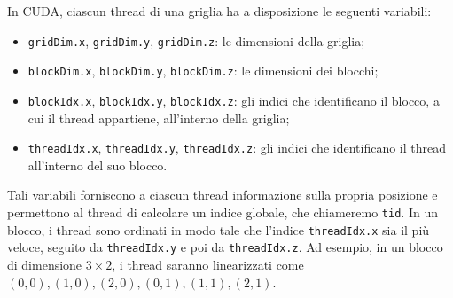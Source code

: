 In CUDA, ciascun thread di una griglia ha a disposizione le seguenti variabili:
\begin{itemize} 
    \item \texttt{gridDim.x}, \texttt{gridDim.y}, \texttt{gridDim.z}: le dimensioni della griglia;
    \item \texttt{blockDim.x}, \texttt{blockDim.y}, \texttt{blockDim.z}: le dimensioni dei blocchi;
    \item \texttt{blockIdx.x}, \texttt{blockIdx.y}, \texttt{blockIdx.z}: gli indici che identificano il blocco, a cui il thread appartiene, all'interno della griglia;
    \item \texttt{threadIdx.x}, \texttt{threadIdx.y}, \texttt{threadIdx.z}: gli indici che identificano il thread all'interno del suo blocco.
\end{itemize}
Tali variabili forniscono a ciascun thread informazione sulla propria posizione e permettono al thread di calcolare un indice globale, che chiameremo \texttt{tid}.
In un blocco, i thread sono ordinati in modo tale che l'indice \texttt{threadIdx.x} sia il più veloce, seguito da \texttt{threadIdx.y} e poi da \texttt{threadIdx.z}. Ad esempio, in un blocco di dimensione \(3\times 2\), i thread saranno linearizzati come \((0,0), (1,0), (2,0), (0, 1), (1,1), (2,1)\).

